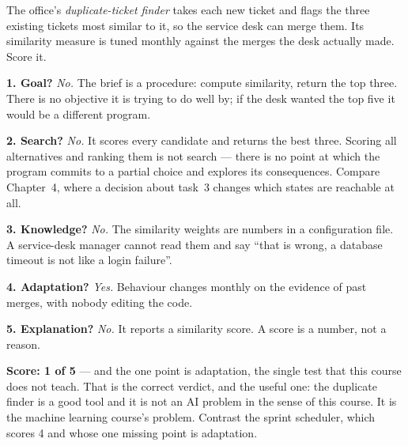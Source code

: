 \begin{worked}
The office's \emph{duplicate-ticket finder} takes each new ticket and flags the
three existing tickets most similar to it, so the service desk can merge them. Its
similarity measure is tuned monthly against the merges the desk actually made.
Score it.

\smallskip
\textbf{1. Goal?} \emph{No.} The brief is a procedure: compute similarity, return
the top three. There is no objective it is trying to do well by; if the desk
wanted the top five it would be a different program.
\smallskip

\textbf{2. Search?} \emph{No.} It scores every candidate and returns the best
three. Scoring all alternatives and ranking them is not search --- there is no
point at which the program commits to a partial choice and explores its
consequences. Compare Chapter~4, where a decision about task~3 changes which
states are reachable at all.
\smallskip

\textbf{3. Knowledge?} \emph{No.} The similarity weights are numbers in a
configuration file. A service-desk manager cannot read them and say ``that is
wrong, a database timeout is not like a login failure''.
\smallskip

\textbf{4. Adaptation?} \emph{Yes.} Behaviour changes monthly on the evidence of
past merges, with nobody editing the code.
\smallskip

\textbf{5. Explanation?} \emph{No.} It reports a similarity score. A score is a
number, not a reason.
\smallskip

\textbf{Score: 1 of 5} --- and the one point is adaptation, the single test that
this course does not teach. That is the correct verdict, and the useful one: the
duplicate finder is a good tool and it is not an AI problem in the sense of this
course. It is the machine learning course's problem. Contrast the sprint
scheduler, which scores 4 and whose one missing point is adaptation.
\end{worked}

